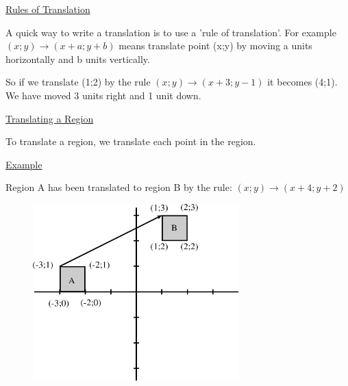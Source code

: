           \label{m39358*id72402}
            \uline{Rules of Translation}
          \par 
          \label{m39358*id72409}A quick way to write a translation is to use a 'rule of translation'. For example $\left(x;y\right)\to \left(x+a;y+b\right)$ means translate point (x;y) by moving a units horizontally and b units vertically.\par 
          \label{m39358*id72456}So if we translate (1;2) by the rule $\left(x;y\right)\to \left(x+3;y-1\right)$ it becomes (4;1). We have moved 3 units right and 1 unit down.\par 
          \label{m39358*id72503}
            \uline{Translating a Region}
          \par 
          \label{m39358*id72511}To translate a region, we translate each point in the region.\par 
          \label{m39358*id72517}
            \uline{Example}
          \par 
          \label{m39358*id72526}Region A has been translated to region B by the rule: $\left(x;y\right)\to \left(x+4;y+2\right)$\par 
          \label{m39358*id72572}
            
    \setcounter{subfigure}{0}


	\begin{figure}[H] %
    \begin{center}
    \label{m39358*id72575!!!underscore!!!media}\label{m39358*id72575!!!underscore!!!printimage}\includegraphics[width=300px]{col11306.imgs/m39358_MG10C14_031.png} %
        
      \vspace{2pt}
    \vspace{.1in}
    
    \end{center}

 \end{figure}   


